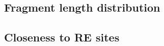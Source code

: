 \documentclass[11pt]{article}
\begin{document}
\subsection{Fragment length distribution}

\subsection{Closeness to RE sites}




\end{document}

